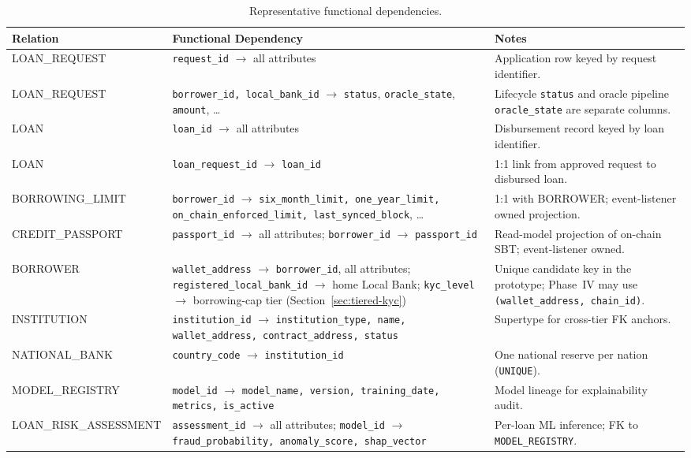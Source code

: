 \documentclass[12pt,a4paper]{report}
\newcommand{\tableheadcolor}{\rowcolor{TableHeadBg}}
\begin{document}
\begin{table}[H]
\centering
\caption[Representative functional dependencies]{Representative functional dependencies.}
\label{tab:functional-deps}
\begin{tabular}{p{3cm}p{5.5cm}p{5cm}}
\toprule
\tableheadcolor
\textbf{Relation} & \textbf{Functional Dependency} & \textbf{Notes} \\
\midrule
LOAN\_REQUEST & \texttt{request\_id} $\to$ all attributes & Application row keyed by request identifier. \\
LOAN\_REQUEST & \texttt{borrower\_id, local\_bank\_id} $\to$ \texttt{status}, \texttt{oracle\_state}, \texttt{amount}, \ldots & Lifecycle \texttt{status} and oracle pipeline \texttt{oracle\_state} are separate columns. \\
LOAN & \texttt{loan\_id} $\to$ all attributes & Disbursement record keyed by loan identifier. \\
LOAN & \texttt{loan\_request\_id} $\to$ \texttt{loan\_id} & 1:1 link from approved request to disbursed loan. \\
BORROWING\_LIMIT & \texttt{borrower\_id} $\to$ \texttt{six\_month\_limit, one\_year\_limit,} \newline \texttt{on\_chain\_enforced\_limit, last\_synced\_block}, \ldots & 1:1 with BORROWER; event-listener owned projection. \\
CREDIT\_PASSPORT & \texttt{passport\_id} $\to$ all attributes; \texttt{borrower\_id} $\to$ \texttt{passport\_id} & Read-model projection of on-chain SBT; event-listener owned. \\
BORROWER & \texttt{wallet\_address} $\to$ \texttt{borrower\_id}, all attributes; \texttt{registered\_local\_bank\_id} $\to$ home Local Bank; \texttt{kyc\_level} $\to$ borrowing-cap tier (Section~\ref{sec:tiered-kyc}) & Unique candidate key in the prototype; Phase~IV may use \texttt{(wallet\_address, chain\_id)}. \\
INSTITUTION & \texttt{institution\_id} $\to$ \texttt{institution\_type, name, wallet\_address, contract\_address, status} & Supertype for cross-tier FK anchors. \\
NATIONAL\_BANK & \texttt{country\_code} $\to$ \texttt{institution\_id} & One national reserve per nation (\texttt{UNIQUE}). \\
MODEL\_REGISTRY & \texttt{model\_id} $\to$ \texttt{model\_name, version, training\_date, metrics, is\_active} & Model lineage for explainability audit. \\
LOAN\_RISK\_ASSESSMENT & \texttt{assessment\_id} $\to$ all attributes; \texttt{model\_id} $\to$ \texttt{fraud\_probability, anomaly\_score, shap\_vector} & Per-loan ML inference; FK to \texttt{MODEL\_REGISTRY}. \\

\end{tabular}
\end{table}
\end{document}
